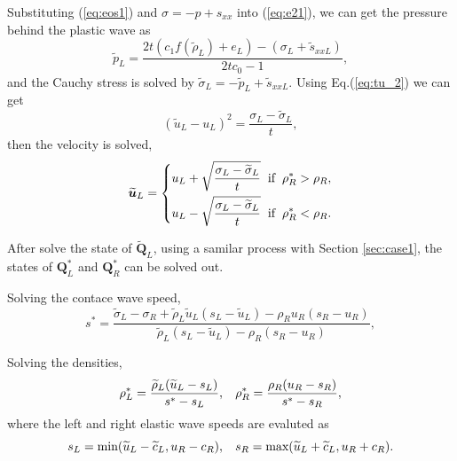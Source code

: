 \documentclass{article}
\numberwithin{equation}{section}
\numberwithin{table}{section}
\begin{document}
Substituting (\ref{eq:eos1}) and $\sigma=-p +s_{xx}$ into (\ref{eq:e21}), we can get the pressure behind the plastic wave as
\begin{equation}
  \widetilde{p}_L= \frac{2t(c_1f(\widetilde{\rho}_L)+e_L)-(\sigma_L+\widetilde{s}_{xxL})}{2tc_0-1},
\end{equation}
and the Cauchy stress is solved by $\widetilde{\sigma}_L = -\widetilde{p}_L+\widetilde{s}_{xxL}$. Using Eq.(\ref{eq:tu_2}) we can get
\begin{equation}
  (\widetilde{u}_L-u_L)^2 = \frac{\sigma_L-\widetilde{\sigma}_L}{t},
\end{equation}
then the velocity is solved,
\begin{equation}
  \widetilde{\bm{u}}_L= \left\{
  \begin{aligned}
	u_L+\sqrt{\frac{\sigma_L-\widetilde{\sigma}_L}{t}} \hspace{0.2cm} \text{if} \hspace{0.2cm} \rho_R^* >\rho_R,\\
	u_L-\sqrt{\frac{\sigma_L-\widetilde{\sigma}_L}{t}} \hspace{0.2cm} \text{if} \hspace{0.2cm} \rho_R^* <\rho_R.\\
\end{aligned} \right.
\end{equation}

After solve the state of $\widetilde{\bm{Q}}_L$,  using a samilar process with Section \ref{sec:case1}, the states of $\bm{Q}_L^*$ and $\bm{Q}_R^*$ can be solved out.

Solving the contace wave speed,
\begin{equation}
  s^* = \frac{\widetilde{\sigma}_L-\sigma_R+\widetilde{\rho}_L \widetilde{u}_L(s_L-\widetilde{u}_L)-\rho_R u_R(s_R-u_R)}{\widetilde{\rho}_L(s_L-\widetilde{u}_L)-\rho_R(s_R-u_R)},
\end{equation}

Solving the densities,
\begin{equation}
  \rho_L^* = \frac{\widetilde{\rho}_L(\widetilde{u}_L-s_L)}{s^*-s_L}, \hspace{0.3cm}  \rho_R^* = \frac{\rho_R(u_R-s_R)}{s^*-s_R},
\end{equation}
where  the left and right  elastic wave speeds are evaluted as 
	\begin{equation}
	  s_L = \text{min} (\widetilde{u}_L-\widetilde{c}_L, u_R-c_R), \hspace{0.3cm} s_R = \text{max}(\widetilde{u}_L+\widetilde{c}_L, u_R+c_R).
	\end{equation}
\end{document}
